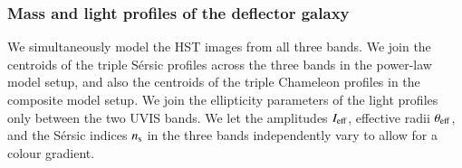 \documentclass[longauth]{aa}
\newcommand{\ajs}[1]{{{#1}}}
\begin{document}
\subsubsection{Mass and light profiles of the deflector galaxy} \label{sec:lenstronomy_deflector_settings}
We simultaneously model the HST images from all three bands. We join the centroids of the triple S\'ersic profiles across the three bands in the power-law model setup, and also the centroids of the triple Chameleon profiles in the composite model setup. We join the ellipticity parameters of the light profiles only between the two UVIS bands. We let the amplitudes $I_{\rm eff}$, effective radii $\theta_{\rm eff}$, and the S\'ersic indices $n_{\rm s}$ in the three bands \ajs{independently vary to allow} for a colour gradient. %
\end{document}
